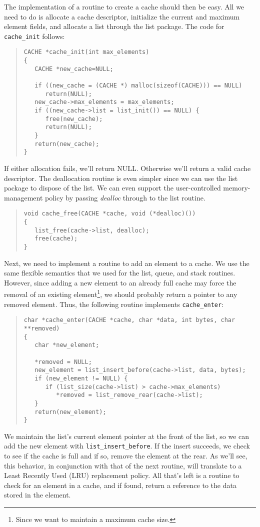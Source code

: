 \newpage
The implementation of a routine to create a cache should then be easy.  All we
need to do is allocate a cache descriptor, initialize the current and maximum
element fields, and allocate a list through the list package.  The code for
{\tt cache\_init} follows:
\begin{quote}
\begin{verbatim}
CACHE *cache_init(int max_elements)
{
   CACHE *new_cache=NULL;

   if ((new_cache = (CACHE *) malloc(sizeof(CACHE))) == NULL)
      return(NULL);
   new_cache->max_elements = max_elements;
   if ((new_cache->list = list_init()) == NULL) {
      free(new_cache);
      return(NULL);
   }
   return(new_cache);
}
\end{verbatim}
\end{quote}
If either allocation fails, we'll return NULL.  Otherwise we'll return a valid
cache descriptor.  The deallocation routine is even simpler since we can use
the list package to dispose of the list.  We can even support the
user-controlled memory-management policy by passing {\em dealloc} through to
the list routine.
\begin{quote}
\begin{verbatim}
void cache_free(CACHE *cache, void (*dealloc)())
{
   list_free(cache->list, dealloc);
   free(cache);
}
\end{verbatim}
\end{quote}

Next, we need to implement a routine to add an element to a cache.  We use the
same flexible semantics that we used for the list, queue, and stack routines.
However, since adding a new element to an already full cache may force the
removal of an existing element\footnote{Since we want to maintain a maximum
cache size.}, we should probably return a pointer to any removed element.
Thus, the following routine implements {\tt cache\_enter}:
\begin{quote}
\begin{verbatim}
char *cache_enter(CACHE *cache, char *data, int bytes, char **removed)
{
   char *new_element;

   *removed = NULL;
   new_element = list_insert_before(cache->list, data, bytes);
   if (new_element != NULL) {
      if (list_size(cache->list) > cache->max_elements)
         *removed = list_remove_rear(cache->list);
   }
   return(new_element);
}
\end{verbatim}
\end{quote}
We maintain the list's current element pointer at the front of the list, so we
can add the new element with {\tt list\_insert\_before}.  If the insert
succeeds, we check to see if the cache is full and if so, remove the element
at the rear.  As we'll see, this behavior, in conjunction with that of the
next routine, will translate to a Least Recently Used (LRU) replacement
policy.  All that's left is a routine to check for an element in a cache, and
if found, return a reference to the data stored in the element.

